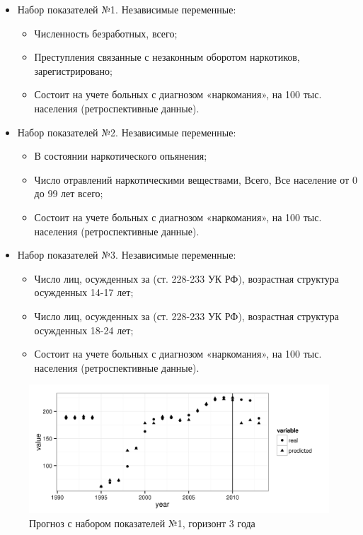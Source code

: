 \begin{itemize}
    \item Набор показателей №1. Независимые переменные:
    \begin{itemize}
        \item Численность безработных, всего;
        \item Преступления связанные с незаконным оборотом наркотиков, 
            зарегистрировано;
        \item Состоит на учете больных с диагнозом «наркомания», на 100 тыс. 
            населения (ретроспективные данные).
    \end{itemize}
    \item Набор показателей №2. Независимые переменные:
    \begin{itemize}
        \item В состоянии наркотического опьянения;
        \item Число отравлений наркотическими веществами, Всего, Все население 
            от 0 до 99 лет  всего;
        \item Состоит на учете больных с диагнозом «наркомания», на 100 тыс. 
            населения (ретроспективные данные).
    \end{itemize}
    \item Набор показателей №3. Независимые переменные:
    \begin{itemize}
        \item Число лиц, осужденных за (ст. 228-233 УК РФ), возрастная структура 
            осужденных  14-17 лет;
        \item Число лиц, осужденных за (ст. 228-233 УК РФ), возрастная структура 
            осужденных  18-24 лет;
        \item Состоит на учете больных с диагнозом «наркомания», на 100 тыс. 
            населения (ретроспективные данные).
    \end{itemize}			
\end{itemize}

\begin{figure}[bhtp]
    \includegraphics{images/m_plot1.png}
    \caption{Прогноз с набором показателей №1, горизонт 3 года}		
    \label{figure:m_plot1}
\end{figure}


